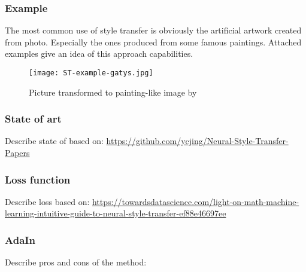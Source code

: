 \documentclass[../Main.tex]{subfiles}
\begin{document}
        
\newpage
    
    \subsubsection{Example}
    The most common use of style transfer is obviously the artificial artwork created from photo. Especially the ones produced from some famous paintings. Attached examples give an idea of this approach capabilities. \\
    \begin{figure}[h!]
        \centering
        \texttt{[image: ST-example-gatys.jpg]}
        \caption{Picture transformed to painting-like image by \cite{gatys2015neural}}
        \label{fig:ST-example-gatys}
    \end{figure}


    
    
    \subsubsection{State of art}
    Describe state of based on: \url{https://github.com/ycjing/Neural-Style-Transfer-Papers}
    
    \subsubsection{Loss function}
    Describe loss based on: \url{https://towardsdatascience.com/light-on-math-machine-learning-intuitive-guide-to-neural-style-transfer-ef88e46697ee}
    
    \subsubsection{AdaIn}
    Describe pros and cons of the method: \cite{huang2017adain} 
\end{document}
